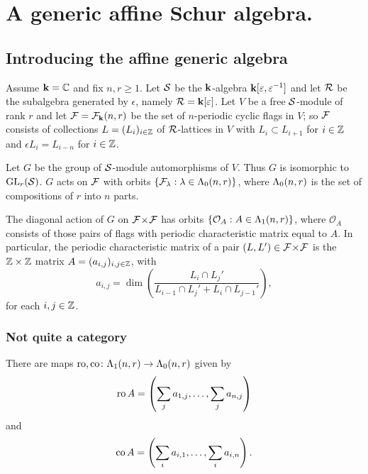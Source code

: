 \documentclass[a4paper, 11pt]{report}
\begin{document}
\chapter{A generic affine Schur algebra.}

\section{Introducing the affine generic algebra}

Assume $\mathbf{k} = \mathbb{C}$ and fix $n,r\geq 1$. Let $\mathcal{S}$ be the $\mathbf{k}$-algebra $\mathbf{k}[\varepsilon,\varepsilon^{-1}]$ and let $\mathcal{R}$ be the subalgebra generated by $\epsilon$, namely $\mathcal{R}=\mathbf{k}[\varepsilon]$. Let $V$ be a free $\mathcal{S}$-module of rank $r$ and let $\mathcal{F} = \mathcal{F}_{\mathbf{k}}(n,r)$ be the set of $n$-periodic cyclic flags in $V$; so $\mathcal{F}$ consists of collections $L = (L_i)_{i\in\mathbb{Z}}$ of $\mathcal{R}$-lattices in $V$ with $L_i\subset L_{i+1}$ for $i\in\mathbb{Z}$ and $\epsilon L_i = L_{i-n}$ for $i\in\mathbb{Z}$.

Let $G$ be the group of $\mathcal{S}$-module automorphisms of $V$. Thus $G$ is isomorphic to $\operatorname{GL}_{r}(\mathcal{S})$. $G$ acts on $\mathcal{F}$ with orbits $\{\mathcal{F}_\lambda:\lambda\in\Lambda_0(n,r)\}$, where $\Lambda_0(n,r)$ is the set of compositions of $r$ into $n$ parts.

The diagonal action of $G$ on ${\mathcal{F}\!\times\!\mathcal{F}}$ has orbits $\{\mathcal{O}_A:A\in\Lambda_1(n,r)\}$, where $\mathcal{O}_A$ consists of those pairs of flags with periodic characteristic matrix equal to $A$. In particular, the periodic characteristic matrix of a pair $(L,L')\in{\mathcal{F}\!\times\!\mathcal{F}}$ is the $\mathbb{Z}\times\mathbb{Z}$ matrix $A = (a_{i,j})_{i,j\in\mathbb{Z}}$, with
\begin{equation*}
a_{i,j} = \dim\left(\frac{L_i\cap L_j'}{L_{i-1}\cap L_j' + L_i\cap L_{j-1}'}\right),
\end{equation*}
for each $i,j\in\mathbb{Z}$.

\subsection{Not quite a category}

There are maps $\operatorname{ro},\operatorname{co}\colon\Lambda_1(n,r)\to\Lambda_0(n,r)$ given by
\begin{equation*}
\operatorname{ro}{A} = \left(\sum_{j} a_{1,j},\ldots, \sum_{j}a_{n,j}\right)
\end{equation*}
and
\begin{equation*}
\operatorname{co}{A} = \left(\sum_{i} a_{i,1},\ldots, \sum_{i} a_{i,n}\right).
\end{equation*}
\end{document}
